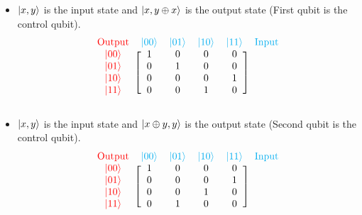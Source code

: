 \documentclass{book}
\begin{document}
\begin{itemize}
    \item $\ket{x, y}$ is the input state and $\ket{x, y \oplus x}$ is the output state (First qubit is the control qubit).
    \[
        \begin{blockarray}
        {cccccc}
        \textcolor{red}{\text{Output}} & \textcolor{cyan}{\ket{00}} & \textcolor{cyan}{\ket{01}} & \textcolor{cyan}{\ket{10}} & \textcolor{cyan}{\ket{11}} & \textcolor{cyan}{\text{Input}} \\
        \begin{block}{c[cccc]c}
        \textcolor{red}{\ket{00}} & 1 & 0 & 0 & 0 & \\
        \textcolor{red}{\ket{01}} & 0 & 1 & 0 & 0 & \\
        \textcolor{red}{\ket{10}} & 0 & 0 & 0 & 1 & \\
        \textcolor{red}{\ket{11}} & 0 & 0 & 1 & 0 & \\
        \end{block}
        \end{blockarray}
    \]
    \item $\ket{x, y}$ is the input state and $\ket{x \oplus y, y}$ is the output state (Second qubit is the control qubit).
    \[
        \begin{blockarray}
        {cccccc}
        \textcolor{red}{\text{Output}} & \textcolor{cyan}{\ket{00}} & \textcolor{cyan}{\ket{01}} & \textcolor{cyan}{\ket{10}} & \textcolor{cyan}{\ket{11}} & \textcolor{cyan}{\text{Input}} \\
        \begin{block}{c[cccc]c}
        \textcolor{red}{\ket{00}} & 1 & 0 & 0 & 0 & \\
        \textcolor{red}{\ket{01}} & 0 & 0 & 0 & 1 & \\
        \textcolor{red}{\ket{10}} & 0 & 0 & 1 & 0 & \\
        \textcolor{red}{\ket{11}} & 0 & 1 & 0 & 0 & \\
        \end{block}
        \end{blockarray}
    \]
\end{itemize}
\end{document}
